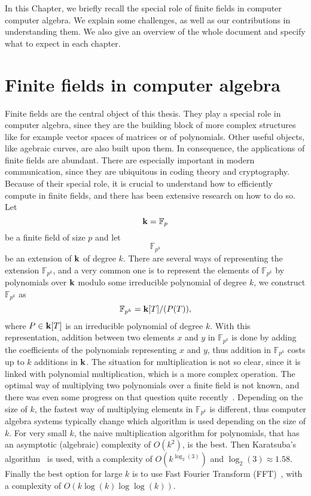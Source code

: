 In this Chapter, we briefly recall the special role of finite fields in computer
computer algebra. We explain some challenges, as well as our contributions in
understanding them. We also give an overview of the whole document and specify
what to expect in each chapter.
\minitoc
\clearpage

\section{Finite fields in computer algebra}

Finite fields are the central object of this thesis. They play a special role in
computer algebra, since they are the building block of more complex structures
like for example vector spaces of matrices or of polynomials. Other useful
objects, like agebraic curves, are also built upon them. In consequence, the
applications of finite fields are abundant. There are especially important in
modern communication, since they are ubiquitous in coding theory and
cryptography. Because of their special role, it is crucial to
understand how to efficiently compute in finite fields, and there has been
extensive research on how to do so. Let 
\[
  \mathbf{k} = \mathbb{F}_{p}
\]
be a finite field of size $p$ and let 
\[
  \mathbb{F}_{p^k}
\]
be an extension of $\mathbf{k}$ of degree $k$. There are several ways of representing
the extension $\mathbb{F}_{p^{k}}$, and a very common one is to represent the
elements of $\mathbb{F}_{p^{k}}$ by polynomials over $\mathbf{k}$ modulo some
irreducible polynomial of degree $k$, \ie we construct $\mathbb{F}_{p^{k}}$ as
\[
  \mathbb{F}_{p^{k}} = \mathbf{k}[T]/(P(T)),
\]
where $P\in\mathbf{k}[T]$ is an irreducible polynomial of degree $k$. With this
representation, addition between two elements $x$ and $y$ in
$\mathbb{F}_{p^{k}}$ is done by adding the coefficients of the polynomials
representing $x$ and $y$, thus addition in $\mathbb{F}_{p^{k}}$ costs up to $k$
additions in $\mathbf{k}$. The situation for multiplication is not so clear, since it is
linked with polynomial multiplication, which is a more complex operation. The
optimal way of multiplying two polynomials over a finite field is not known, and
there was even some progress on that question quite recently~\cite{HVDH19ff}.
Depending on the size of $k$, the fastest way of multiplying elements in
$\mathbb{F}_{p^k}$ is different, thus computer algebra systems typically change
which algorithm is used depending on the size of $k$. For very small $k$, the
naive multiplication algorithm for polynomials, that has an asymptotic
(algebraic) complexity of $O(k^2)$, is the best. Then Karatsuba's
algorithm~\cite{Karatsuba63} is used, with a complexity of $O(k^{\log_2(3)})$
and $\log_2(3)\approx1.58$. Finally the best option for
large $k$ is to use Fast Fourier Transform (FFT)~\cite{CT65, SS71}, with a
complexity of $O(k\log(k)\log\log(k))$.

